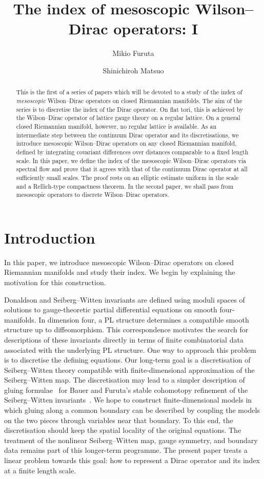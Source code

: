 \documentclass[a4paper,oneside,12pt]{amsart}
\title{The index of mesoscopic Wilson--Dirac operators: I}
\author[M. Furuta]{Mikio Furuta}
\author[S. Matsuo]{Shinichiroh Matsuo}
\theoremstyle{plain}
\theoremstyle{definition}
\theoremstyle{remark}
\begin{document}
\begin{abstract}
  This is the first of a series of papers which will be devoted to a study of the index of \emph{mesoscopic} Wilson--Dirac operators on closed Riemannian manifolds.
  The aim of the series is to discretise the index of the Dirac operator.
  On flat tori, this is achieved by the Wilson--Dirac operator of lattice gauge theory on a regular lattice.
  On a general closed Riemannian manifold, however, no regular lattice is available.
  As an intermediate step between the continuum Dirac operator and its discretisations, we introduce mesoscopic Wilson--Dirac operators on any closed Riemannian manifold, defined by integrating covariant differences over distances comparable to a fixed length scale.
  In this paper, we define the index of the mesoscopic Wilson--Dirac operators via spectral flow and prove that it agrees with that of the continuum Dirac operator at all sufficiently small scales.
  The proof rests on an elliptic estimate uniform in the scale and a Rellich-type compactness theorem.
  In the second paper, we shall pass from mesoscopic operators to discrete Wilson--Dirac operators.
\end{abstract}
\maketitle

\setcounter{tocdepth}{3}
\tableofcontents

\section{Introduction}

In this paper, we introduce mesoscopic Wilson--Dirac operators on closed Riemannian manifolds and study their index.
We begin by explaining the motivation for this construction.

Donaldson and Seiberg--Witten invariants are defined using moduli spaces of solutions to gauge-theoretic partial differential equations on smooth four-manifolds.
In dimension four, a PL structure determines a compatible smooth structure up to diffeomorphism.
This correspondence motivates the search for descriptions of these invariants directly in terms of finite combinatorial data associated with the underlying PL structure.
One way to approach this problem is to discretise the defining equations.
Our long-term goal is a discretisation of Seiberg--Witten theory compatible with finite-dimensional approximation of the Seiberg--Witten map.
The discretisation may lead to a simpler description of gluing formulae~\cite{MR2312050} for Bauer and Furuta's stable cohomotopy refinement of the Seiberg--Witten invariants~\cite{MR2025298}.
We hope to construct finite-dimensional models in which gluing along a common boundary can be described by coupling the models on the two pieces through variables near that boundary.
To this end, the discretisation should keep the spatial locality of the original equations.
The treatment of the nonlinear Seiberg--Witten map, gauge symmetry, and boundary data remains part of this longer-term programme.
The present paper treats a linear problem towards this goal: how to represent a Dirac operator and its index at a finite length scale.
\end{document}
